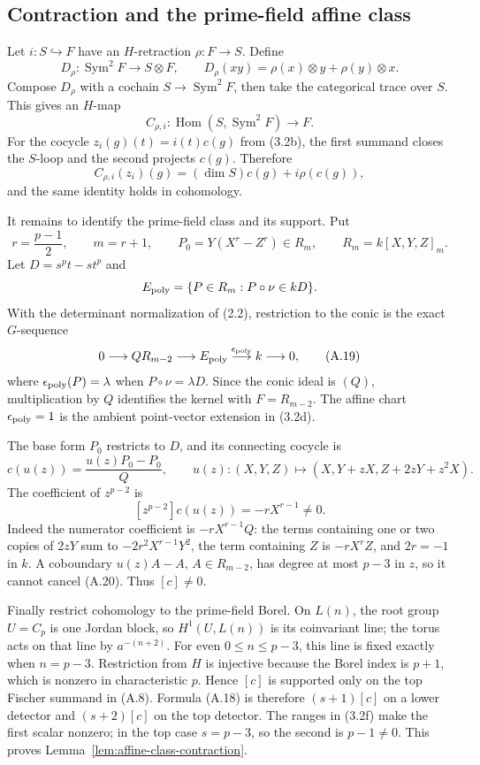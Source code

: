 \documentclass[11pt]{article}
\theoremstyle{definition}
\theoremstyle{remark}
\begin{document}
\subsection{Contraction and the prime-field affine class}
\label{app:contraction-proof}

Let \(i:S\hookrightarrow F\) have an \(H\)-retraction
\(\rho:F\to S\).  Define
\[
 D_\rho:\operatorname{Sym}^2F\longrightarrow S\otimes F,\qquad
 D_\rho(xy)=\rho(x)\otimes y+\rho(y)\otimes x.
\]
Compose \(D_\rho\) with a cochain
\(S\to\operatorname{Sym}^2F\), then take the categorical trace over
\(S\).  This gives an \(H\)-map
\[
 C_{\rho,i}:\operatorname{Hom}(S,\operatorname{Sym}^2F)\longrightarrow F.
\]
For the cocycle \(z_i(g)(t)=i(t)c(g)\) from (3.2b), the first summand
closes the \(S\)-loop and the second projects \(c(g)\).  Therefore
\[
 C_{\rho,i}(z_i)(g)=(\dim S)c(g)+i\rho(c(g)),           \tag{A.18}
\]
and the same identity holds in cohomology.

It remains to identify the prime-field class and its support.  Put
\[
 r=\frac{p-1}{2},\qquad m=r+1,\qquad
 P_0=Y(X^r-Z^r)\in R_m,\qquad R_m=k[X,Y,Z]_m.
\]
Let \(D=s^pt-st^p\) and
\[
 E_{\rm poly}=\{P\in R_m:P\circ\nu\in kD\}.
\]
With the determinant normalization of (2.2), restriction to the conic is
the exact \(G\)-sequence
\[
 0\longrightarrow QR_{m-2}\longrightarrow E_{\rm poly}
 \mathrel{\mathop{\longrightarrow}^{\epsilon_{\rm poly}}}k
 \longrightarrow0,                                    \tag{A.19}
\]
where \(\epsilon_{\rm poly}(P)=\lambda\) when
\(P\circ\nu=\lambda D\).  Since the conic ideal is \((Q)\),
multiplication by \(Q\) identifies the kernel with \(F=R_{m-2}\).
The affine chart \(\epsilon_{\rm poly}=1\) is the ambient point-vector
extension in (3.2d).

The base form \(P_0\) restricts to \(D\), and its connecting cocycle is
\[
 c(u(z))=\frac{u(z)P_0-P_0}{Q},\qquad
 u(z):(X,Y,Z)\mapsto(X,Y+zX,Z+2zY+z^2X).
\]
The coefficient of \(z^{p-2}\) is
\[
 [z^{p-2}]c(u(z))=-rX^{r-1}\ne0.                       \tag{A.20}
\]
Indeed the numerator coefficient is \(-rX^{r-1}Q\): the terms containing
one or two copies of \(2zY\) sum to
\(-2r^2X^{r-1}Y^2\), the term containing \(Z\) is \(-rX^rZ\), and
\(2r=-1\) in \(k\).  A coboundary \(u(z)A-A\), \(A\in R_{m-2}\), has
degree at most \(p-3\) in \(z\), so it cannot cancel (A.20).
Thus \([c]\ne0\).

Finally restrict cohomology to the prime-field Borel.  On \(L(n)\), the
root group \(U=C_p\) is one Jordan block, so \(H^1(U,L(n))\) is its
coinvariant line; the torus acts on that line by \(a^{-(n+2)}\).
For even \(0\le n\le p-3\), this line is fixed exactly when \(n=p-3\).
Restriction from \(H\) is injective because the Borel index is \(p+1\),
which is nonzero in characteristic \(p\).  Hence \([c]\) is supported
only on the top Fischer summand in (A.8).  Formula (A.18) is therefore
\((s+1)[c]\) on a lower detector and \((s+2)[c]\) on the top detector.
The ranges in (3.2f) make the first scalar nonzero; in the top case
\(s=p-3\), so the second is \(p-1\ne0\).  This proves
Lemma~\ref{lem:affine-class-contraction}.
\end{document}
